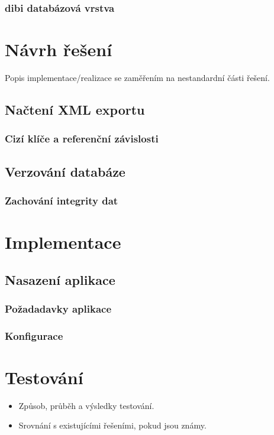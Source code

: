 \documentclass[11pt,oneside,a4paper]{book}
\begin{document}
\subsection{dibi databázová vrstva}



\chapter{Návrh řešení}
Popis implementace/realizace se zaměřením na nestandardní části řešení.

\section{Načtení XML exportu}
\subsection{Cizí klíče a referenční závislosti}
\section{Verzování databáze}
\subsection{Zachování integrity dat}



\chapter{Implementace}

 
\section{Nasazení aplikace}
\subsection{Požadadavky aplikace}
\subsection{Konfigurace}

\chapter{Testování}
\begin{itemize}
 \item Způsob, průběh a výsledky testování.
 \item Srovnání s existujícími řešeními, pokud jsou známy.
\end{itemize}
\end{document}
